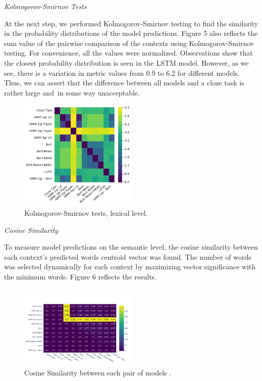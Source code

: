 \documentclass[a4paper]{article}
\newcommand{\head}[1]{\vspace{0.5em}\emph{#1}\vspace{0.25em}}
\begin{document}
\head{Kolmogorov-Smirnov Tests}

At the next step, we performed Kolmogorov-Smirnov testing to find the similarity in the probability distributions of the model predictions. Figure 5 also reflects the sum value of the pairwise comparison of the contexts using Kolmogorov-Smirnov testing. For convenience, all the values were normalized. Observations show that the closest probability distribution is seen in the LSTM model. However, as we see, there is a variation in metric values from 0.9 to 6.2 for different models. Thus, we can assert that the difference between all models and a cloze task is rather large and in some way unacceptable.

\begin{figure}
\caption{Kolmogorov-Smirnov tests, lexical level.}
\label{fig:ks-lexical}
\centering
\includegraphics[width=0.5\textwidth]{figures/pdf/ks-lexical.pdf}
\end{figure}

\head{Cosine Similarity}

To measure model predictions on the semantic level, the cosine similarity between each context’s predicted words centroid vector was found. The number of words was selected dynamically for each context by maximizing vector significance with the minimum words. Figure 6 reflects the results.
\begin{figure}
\caption{Cosine Similarity between each pair of models .}
\label{fig:ks-lexical-pairs}
\centering
\includegraphics[width=0.5\textwidth]{figures/pdf/cosine-similarity-lexical.pdf}
\end{figure}
\end{document}
